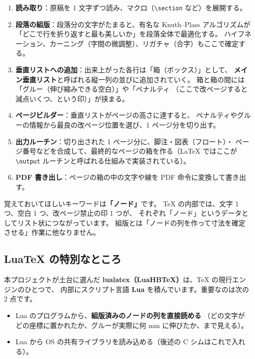 \documentclass[11pt,a4paper]{ltjsarticle}
\newcommand{\cs}[1]{\texttt{\textbackslash #1}}
\begin{document}
\begin{enumerate}
\item \textbf{読み取り}：原稿を 1 文字ずつ読み、マクロ（\cs{section} など）を展開する。
\item \textbf{段落の組版}：段落分の文字がたまると、有名な Knuth--Plass
  アルゴリズムが「どこで行を折り返すと最も美しいか」を段落全体で最適化する。
  ハイフネーション、カーニング（字間の微調整）、リガチャ（合字）もここで確定する。
\item \textbf{垂直リストへの追加}：出来上がった各行は「箱（ボックス）」として、
  \textbf{メイン垂直リスト}と呼ばれる縦一列の並びに追加されていく。
  箱と箱の間には「グルー（伸び縮みできる空白）」や「ペナルティ
  （ここで改ページすると減点いくつ、という印）」が挟まる。
\item \textbf{ページビルダー}：垂直リストがページの高さに達すると、
  ペナルティやグルーの情報から最良の改ページ位置を選び、1 ページ分を切り出す。
\item \textbf{出力ルーチン}：切り出された 1 ページ分に、脚注・図表（フロート）・
  ページ番号などを合成して、最終的なページの箱を作る（LaTeX ではここが
  \cs{output} ルーチンと呼ばれる仕組みで実装されている）。
\item \textbf{PDF 書き出し}：ページの箱の中の文字や線を PDF 命令に変換して書き出す。
\end{enumerate}

覚えておいてほしいキーワードは\textbf{「ノード」}です。
TeX の内部では、文字 1 つ、空白 1 つ、改ページ禁止の印 1 つが、
それぞれ「ノード」というデータとしてリスト状につながっています。
組版とは「ノードの列を作って寸法を確定させる」作業に他なりません。

\subsection{LuaTeX の特別なところ}

本プロジェクトが土台に選んだ \textbf{lualatex（LuaHBTeX）}は、TeX の現行エンジンのひとつで、
内部にスクリプト言語 \textbf{Lua} を積んでいます。重要なのは次の 2 点です。

\begin{itemize}
\item Lua のプログラムから、\textbf{組版済みのノードの列を直接読める}
  （どの文字がどの座標に置かれたか、グルーが実際に何 mm に伸びたか、まで見える）。
\item Lua から OS の共有ライブラリを読み込める（後述の C シムはこれで入れる）。
\end{itemize}
\end{document}
